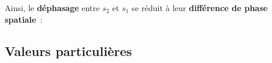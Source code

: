 \documentclass[../../main/main.tex]{subfiles}
\begin{document}
\begin{tcb*}[breakable]
\begin{isd}[righthand ratio=.25]
\begin{center}
{			}
			\vspace{-15pt}
			\captionsetup{justification=centering}
		\end{center}
	\end{isd}
	Ainsi, le \textbf{déphasage} entre $s_2$ et $s_1$ se réduit à leur
	\textbf{différence de phase spatiale}~:
	\psw{%
		\[
			\D\f_{2/1}(\Mr) =
			(\wt \underbracket[1pt]{-k\SaMr + \f_{02}}_{\f_2(\Mr)}) -
			(\wt \underbracket[1pt]{-k\SbMr + \f_{01}}_{\f_1(\Mr)})
			\Lra
			\boxed{\D\f_{2/1}(\Mr) = \f_2(\Mr) - \f_1(\Mr)}
		\]
	}%
	\vspace{-15pt}
\end{tcb*}

\subsection{Valeurs particulières}
\end{document}

